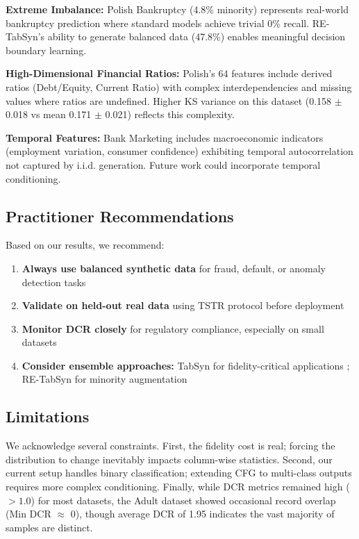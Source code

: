 \documentclass[conference]{IEEEtran}
\begin{document}
\textbf{Extreme Imbalance:} Polish Bankruptcy (4.8\% minority) represents real-world bankruptcy prediction where standard models achieve trivial 0\% recall. RE-TabSyn's ability to generate balanced data (47.8\%) enables meaningful decision boundary learning.

\textbf{High-Dimensional Financial Ratios:} Polish's 64 features include derived ratios (Debt/Equity, Current Ratio) with complex interdependencies and missing values where ratios are undefined. Higher KS variance on this dataset (0.158 $\pm$ 0.018 vs mean 0.171 $\pm$ 0.021) reflects this complexity.

\textbf{Temporal Features:} Bank Marketing includes macroeconomic indicators (employment variation, consumer confidence) exhibiting temporal autocorrelation not captured by i.i.d. generation. Future work could incorporate temporal conditioning.

\subsection{Practitioner Recommendations}
Based on our results, we recommend:
\begin{enumerate}
    \item \textbf{Always use balanced synthetic data} for fraud, default, or anomaly detection tasks
    \item \textbf{Validate on held-out real data} using TSTR protocol before deployment
    \item \textbf{Monitor DCR closely} for regulatory compliance, especially on small datasets
    \item \textbf{Consider ensemble approaches:} TabSyn for fidelity-critical applications ; RE-TabSyn for minority augmentation
\end{enumerate}

\subsection{Limitations}
We acknowledge several constraints. First, the fidelity cost is real; forcing the distribution to change inevitably impacts column-wise statistics. Second, our current setup handles binary classification; extending CFG to multi-class outputs requires more complex conditioning. Finally, while DCR metrics remained high ($> 1.0$) for most datasets, the Adult dataset showed occasional record overlap (Min DCR $\approx$ 0), though average DCR of 1.95 indicates the vast majority of samples are distinct.
\end{document}
